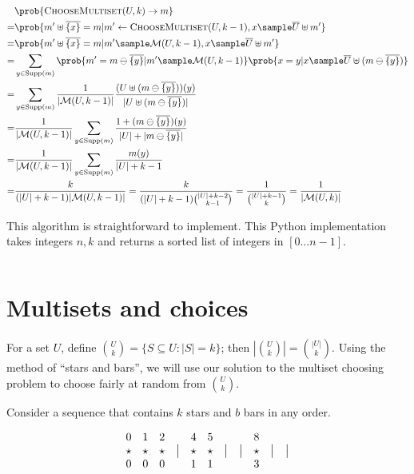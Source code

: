 \documentclass[letterpaper,luatex,11pt]{article}
\DeclareMathOperator{\Supp}{Supp}
\begin{document}
\begin{align*}
    &\prob{\textproc{ChooseMultiset}(U, k) \rightarrow m}
    \\
    =&
    \prob{m' \uplus \overline{\{x\}} = m
        | m' \leftarrow \textproc{ChooseMultiset}(U, k-1), x \sample \overline{U} \uplus m'}
    \\
    =&
    \prob{m' \uplus \overline{\{x\}} = m
        | m' \sample \mathcal{M}(U, k-1), x \sample \overline{U} \uplus m'}
    \\
    =&
    \sum_{y \in \Supp(m)}
    \prob{m' = m \ominus \overline{\{y\}} | m' \sample \mathcal{M}(U, k-1)}
    \prob{x = y | x \sample \overline{U} \uplus (m \ominus \overline{\{y\}})}
    \\
    =&
    \sum_{y \in \Supp(m)}
    \frac{1}{|\mathcal{M}(U, k-1)|}
    \frac{(U \uplus (m \ominus \overline{\{y\}}))(y)}{|U \uplus (m \ominus \overline{\{y\}})|}
    \\
    =&
    \frac{1}{|\mathcal{M}(U, k-1)|}
    \sum_{y \in \Supp(m)}
    \frac{1 + (m \ominus \overline{\{y\}})(y)}{|U| + |m \ominus \overline{\{y\}}|}
    \\
    =&
    \frac{1}{|\mathcal{M}(U, k-1)|}
    \sum_{y \in \Supp(m)}
    \frac{m(y)}{|U| + k -1}
    \\
    =& \frac{k}{(|U| + k -1)|\mathcal{M}(U, k-1)|}
    = \frac{k}{(|U| + k -1)\binom{|U| + k - 2}{k-1}}
    = \frac{1}{\binom{|U| + k - 1}{k}}
    = \frac{1}{|\mathcal{M}(U, k)|}
\end{align*}

This algorithm is straightforward to implement. This Python implementation takes integers
$n, k$ and returns a sorted list of integers in $[0 \ldots n-1]$.

\inputminted{Python}{choose_multiset.py}

\section{Multisets and choices}

For a set $U$, define $\binom{U}{k} = \{S \subseteq U: |S| = k\}$;
then $\left|\binom{U}{k}\right| = \binom{|U|}{k}$. Using the method of ``stars and bars'', we
will use our solution to the multiset choosing problem to choose fairly at random from
$\binom{U}{k}$.

Consider a sequence that contains $k$ stars and $b$ bars in any order.

\begin{displaymath}
\begin{array}{ c c c c c c c c c c c }
    0 & 1 & 2 & & 4 & 5 & & & 8 & & \\
    \star & \star & \star & \big| & \star & \star & \big| & \big| & \star & \big| & \big| \\
    0 & 0 & 0 & & 1 & 1 & & & 3 & & \\
\end{array}
\end{displaymath}
\end{document}

